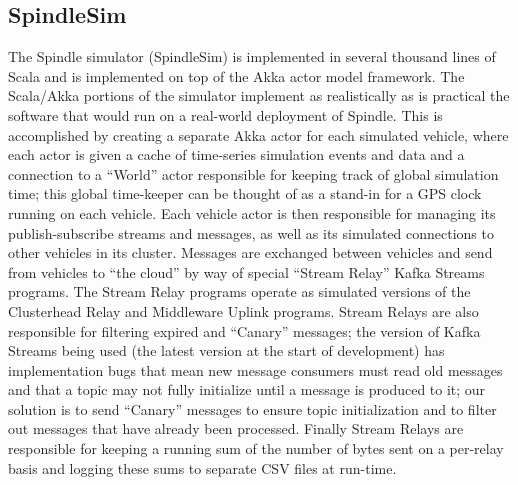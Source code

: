 \documentclass{thesis}
\begin{document}
\subsection{SpindleSim}
    The Spindle simulator (SpindleSim) is implemented in several thousand lines of Scala \cite{scala} 
    and is implemented on top of the Akka
    actor model framework. The Scala/Akka portions of the simulator implement as realistically
    as is practical the software that would run on a real-world deployment of Spindle. This is
    accomplished by creating a separate Akka actor for each simulated vehicle, where each actor
    is given a cache of time-series simulation events and data and a connection to a ``World''
    actor responsible for keeping track of global simulation time; this global time-keeper 
    can be thought of as a stand-in for a GPS clock running on each vehicle. Each vehicle
    actor is then responsible for managing its publish-subscribe streams and messages, as well
    as its simulated connections to other vehicles in its cluster. Messages are exchanged between
    vehicles and send from vehicles to ``the cloud'' by way of special ``Stream Relay'' Kafka Streams
    programs. The Stream Relay programs operate as simulated versions of the Clusterhead Relay
    and Middleware Uplink programs. Stream Relays are also responsible for filtering 
    expired and ``Canary'' messages; the version of Kafka Streams being used (the latest version
    at the start of development) has implementation bugs that mean new message consumers must
    read old messages and that a topic may not fully initialize until a message is produced to it;
    our solution is to send ``Canary'' messages to ensure topic initialization and to filter out messages
    that have already been processed. Finally Stream Relays are responsible for keeping a 
    running sum of the number of bytes sent on a per-relay basis and logging these sums to separate 
    CSV files at run-time.
\end{document}
